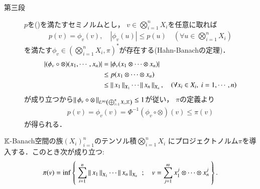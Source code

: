\begin{prf}
\begin{description}
			\item[第三段]
				$p$を()を満たすセミノルムとし，
				$v \in \bigotimes_{i=1}^n X_i$を任意に取れば
				\begin{align}
					p(v) = \phi_v(v),
					\quad |\phi_v(u)| \leq p(u)
					\quad (\forall u \in \bigotimes_{i=1}^n X_i)
				\end{align}
				を満たす$\phi_v \in (\bigotimes_{i=1}^n X_i,\pi)^*$が存在する(Hahn-Banachの定理)．
				\begin{align}
					\left| (\phi_v \circ \otimes)(x_1,\cdots,x_n) \right|
					&= \left|\phi_v(x_1 \otimes \cdots \otimes x_n)\right| \\ 
					&\leq p(x_1 \otimes \cdots \otimes x_n) \\
					&\leq \Norm{x_1}{X_1} \cdots \Norm{x_n}{X_n},
					\quad (\forall x_i \in X_i,\ i=1,\cdots,n)
				\end{align}
				が成り立つから$\Norm{\phi_v \circ \otimes}{\ContLn{\bigoplus_{i=1}^n X_i}{\K}{n}} \leq 1$が従い，
				$\pi$の定義より
				\begin{align}
					p(v) = \phi_v(v) = \Phi^{-1}(\phi_v \circ \otimes)(v)
					\leq \pi(v)
				\end{align}
				が得られる．
				\QED
		\end{description}
	\end{prf}
	
	\begin{screen}
		\begin{thm}[プロジェクティブノルムの表現]
			$\K$-Banach空間の族$(X_i)_{i=1}^n$のテンソル積$\bigotimes_{i=1}^n X_i$
			にプロジェクトノルム$\pi$を導入する．このとき次が成り立つ:
			\begin{align}
				\pi(v) = \inf{}{\Set{\sum_{i=1}^n \Norm{x_1}{X_1} \cdots \Norm{x_n}{X_n}}{
					v = \sum_{j=1}^m x^j_1 \otimes \cdots \otimes x^j_n}}.
			\end{align}
		\end{thm}
	\end{screen}
	
